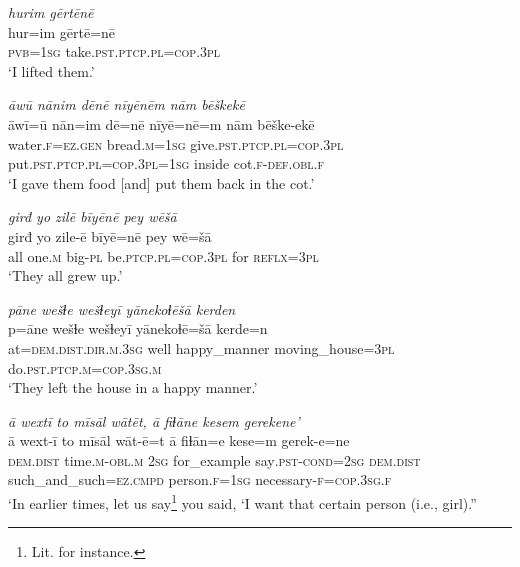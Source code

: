 \ea \label{ŽE.66}
\textit{hurim gērtēnē} \\ 
\gll hur=im gērtē=nē \\ 
 \textsc{pvb}\textsc{=\textsc{1sg}} take\textsc{.pst}\textsc{.ptcp}\textsc{.pl}\textsc{=cop}\textsc{.3pl} \\ 
\glt `I lifted them.'
\z 
 
\ea \label{ŽE.67}
\textit{āwū nānim dēnē nīyēnēm nām bēškekē} \\ 
\gll āwī=ū nān=im dē=nē nīyē=nē=m nām bēške-ekē \\ 
 water\textsc{.f}\textsc{\textsc{=ez.gen}} bread\textsc{.m}\textsc{=\textsc{1sg}} give\textsc{.pst}\textsc{.ptcp}\textsc{.pl}\textsc{=cop}\textsc{.3pl} put\textsc{.pst}\textsc{.ptcp}\textsc{.pl}\textsc{=cop}\textsc{.3pl}\textsc{=\textsc{1sg}} inside cot\textsc{.f}\textsc{-def}\textsc{.obl}\textsc{.f} \\ 
\glt `I gave them food [and] put them back in the cot.'
\z 
 
\ea \label{ŽE.68}
\textit{girđ yo zilē bīyēnē pey wēšā} \\ 
\gll girđ yo zile-ē bīyē=nē pey wē=šā \\ 
 all one\textsc{.m} big\textsc{\textsc{-pl}} be\textsc{.ptcp}\textsc{.pl}\textsc{=cop}\textsc{.3pl} for \textsc{reflx}\textsc{=3pl} \\ 
\glt `They all grew up.'
\z 
 
\ea \label{ŽE.71}
\textit{pāne wešɫe wešɫeyī yānekoɫēšā kerden} \\ 
\gll p=āne wešɫe wešɫeyī yānekoɫē=šā kerde=n \\ 
 at=\textsc{dem.dist}\textsc{.dir}\textsc{.m}\textsc{.3sg} well happy\_manner moving\_house\textsc{=3pl} do\textsc{.pst}\textsc{.ptcp}\textsc{.m}\textsc{=cop}\textsc{.3sg}\textsc{.m} \\ 
\glt `They left the house in a happy manner.'
\z 
 
\ea \label{ŽE.73}
\textit{ā wextī to mīsāl wātēt, ā fiɫāne kesem gerekene’} \\ 
\gll ā wext-ī to mīsāl wāt-ē=t ā fiɫān=e kese=m gerek-e=ne \\ 
 \textsc{dem.dist} time\textsc{.m}\textsc{-obl}\textsc{.m} \textsc{2sg} for\_example say\textsc{.pst}\textsc{-cond}\textsc{=\textsc{2sg}} \textsc{dem.dist} such\_and\_such\textsc{=ez}\textsc{.cmpd} person\textsc{.f}\textsc{=\textsc{1sg}} necessary\textsc{-f}\textsc{=cop}\textsc{.3sg}\textsc{.f} \\ 
\glt `In earlier times, let us say\footnote{Lit. for instance.} you said, ‘I want that certain person (i.e., girl).''
\z 
 
